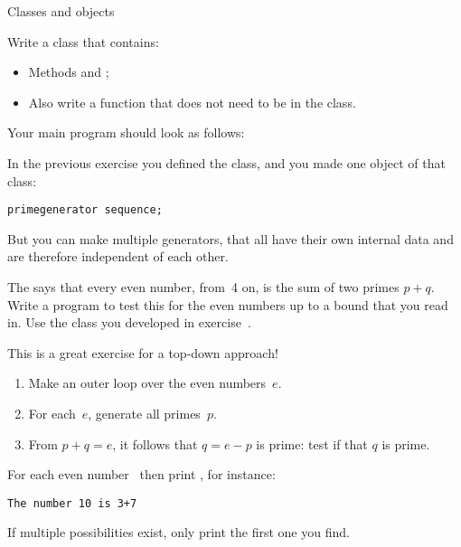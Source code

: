  {Classes and objects}
\label{sec:prime-seq-class}


\begin{comment}
  In exercise~\textbookref{ex:prime:struct} you made a structure that contains
  the data for a primesequence, and you have separate functions that
  operate on that structure or on its members.
\end{comment}

\begin{exercise}
  \label{ex:prime:sequence}
  Write a class  that contains:
  \begin{itemize}
  \item Methods   and ;
  \item Also write a function  that does not need to be
    in the class.
  \end{itemize}

  Your main program should look as follows:
\end{exercise}

In the previous exercise you defined the  class, and
you made one object of that class:
\begin{lstlisting}
primegenerator sequence;
\end{lstlisting}
But you can make multiple generators, that all have their own internal
data and are therefore independent of each other.

\begin{exercise}
  \label{ex:goldbach:conj}
  The  says that every even number,
  from~4 on, is the sum of two primes $p+q$. Write a program to test this
  for the even numbers up to a bound that you read in.
  Use the  class you developed in exercise~.

  This is a great exercise for a top-down approach!
  \begin{enumerate}
  \item
    Make an outer loop over the even numbers~$e$.
  \item For each~$e$, generate all primes~$p$.
  \item From $p+q=e$, it follows that $q=e-p$ is prime: test if
    that $q$ is prime.
  \end{enumerate}
  For each even number~ then print , for instance:
  \begin{verbatim}
The number 10 is 3+7
  \end{verbatim}
  If multiple possibilities exist, only print the first one you find.
\end{exercise}

